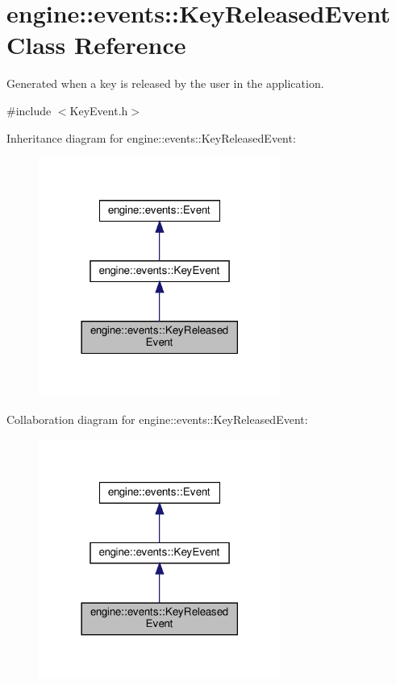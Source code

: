 \hypertarget{classengine_1_1events_1_1KeyReleasedEvent}{}\section{engine\+:\+:events\+:\+:Key\+Released\+Event Class Reference}
\label{classengine_1_1events_1_1KeyReleasedEvent}


Generated when a key is released by the user in the application.  




{\ttfamily \#include $<$Key\+Event.\+h$>$}



Inheritance diagram for engine\+:\+:events\+:\+:Key\+Released\+Event\+:\nopagebreak
\begin{figure}[H]
\begin{center}
\leavevmode
\includegraphics[width=225pt]{classengine_1_1events_1_1KeyReleasedEvent__inherit__graph}
\end{center}
\end{figure}


Collaboration diagram for engine\+:\+:events\+:\+:Key\+Released\+Event\+:\nopagebreak
\begin{figure}[H]
\begin{center}
\leavevmode
\includegraphics[width=225pt]{classengine_1_1events_1_1KeyReleasedEvent__coll__graph}
\end{center}
\end{figure}
